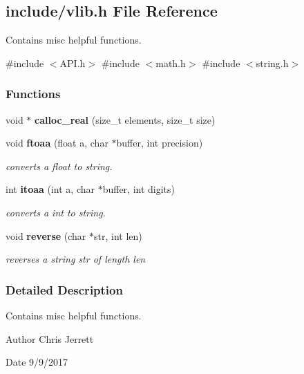 \subsection{include/vlib.h File Reference}
\label{vlib_8h}


Contains misc helpful functions.  


{\ttfamily \#include $<$A\+P\+I.\+h$>$}\newline
{\ttfamily \#include $<$math.\+h$>$}\newline
{\ttfamily \#include $<$string.\+h$>$}\newline
\subsubsection*{Functions}
\begin{DoxyCompactItemize}
\item 
void $\ast$ \textbf{ calloc\+\_\+real} (size\+\_\+t elements, size\+\_\+t size)
\item 
void \textbf{ ftoaa} (float a, char $\ast$buffer, int precision)
\begin{DoxyCompactList}\small\item\em converts a float to string. \end{DoxyCompactList}\item 
int \textbf{ itoaa} (int a, char $\ast$buffer, int digits)
\begin{DoxyCompactList}\small\item\em converts a int to string. \end{DoxyCompactList}\item 
void \textbf{ reverse} (char $\ast$str, int len)
\begin{DoxyCompactList}\small\item\em reverses a string \textquotesingle{}str\textquotesingle{} of length \textquotesingle{}len\textquotesingle{} \end{DoxyCompactList}\end{DoxyCompactItemize}


\subsubsection{Detailed Description}
Contains misc helpful functions. 

\begin{DoxyAuthor}{Author}
Chris Jerrett 
\end{DoxyAuthor}
\begin{DoxyDate}{Date}
9/9/2017 
\end{DoxyDate}


